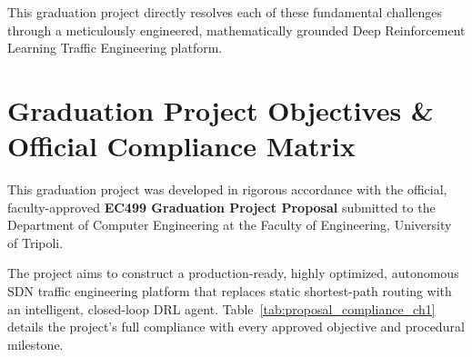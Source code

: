 This graduation project directly resolves each of these fundamental challenges through a meticulously engineered, mathematically grounded Deep Reinforcement Learning Traffic Engineering platform.

\section{Graduation Project Objectives \& Official Compliance Matrix}
This graduation project was developed in rigorous accordance with the official, faculty-approved \textbf{EC499 Graduation Project Proposal} submitted to the Department of Computer Engineering at the Faculty of Engineering, University of Tripoli. 

The project aims to construct a production-ready, highly optimized, autonomous SDN traffic engineering platform that replaces static shortest-path routing with an intelligent, closed-loop DRL agent. Table~\ref{tab:proposal_compliance_ch1} details the project's full compliance with every approved objective and procedural milestone.

